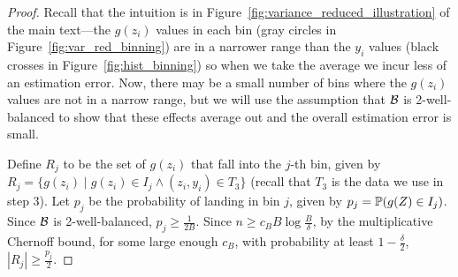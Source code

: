 \begin{proof}

Recall that the intuition is in Figure~\ref{fig:variance_reduced_illustration} of the main text---the $g(z_i)$ values in each bin (gray circles in Figure~\ref{fig:var_red_binning}) are in a narrower range than the $y_i$ values (black crosses in Figure~\ref{fig:hist_binning}) so when we take the average we incur less of an estimation error. Now, there may be a small number of bins where the $g(z_i)$ values are not in a narrow range, but we will use the assumption that $\mathcal{B}{}$ is 2-well-balanced to show that these effects average out and the overall estimation error is small.

Define $R_j$ to be the set of $g(z_i)$ that fall into the $j$-th bin, given by $R_j = \{g(z_i) \mid g(z_i) \in I_j \wedge (z_i, y_i) \in T_3\}$ (recall that $T_3$ is the data we use in step 3).
Let $p_j$ be the probability of landing in bin $j$, given by $p_j = \mathbb{P}(g(Z) \in I_j)$.
Since $\mathcal{B}{}$ is 2-well-balanced, $p_j \geq \frac{1}{2B}$.
Since $n \geq c_B B\log{\frac{B}{\delta}}$, by the multiplicative Chernoff bound, for some large enough $c_B$, with probability at least $1 - \frac{\delta}{2}$, $|R_j| \geq \frac{p_j}{2}$.


\end{proof}
